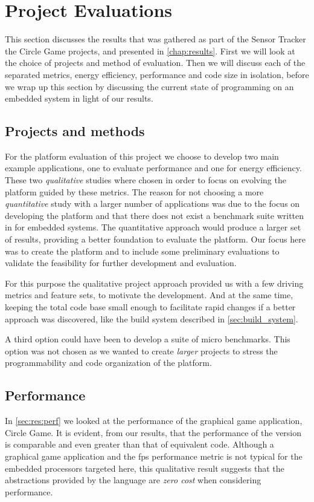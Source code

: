 
\section{Project Evaluations}
\label{sec:disc:project_evaluations}

This section discusses the results that was gathered as part of the Sensor Tracker the Circle Game projects, and presented in \autoref{chap:results}.
First we will look at the choice of projects and method of evaluation.
Then we will discuss each of the separated metrics, energy efficiency, performance and code size in isolation, before we wrap up this section by discussing the current state of {\rust} programming on an embedded system in light of our results.

\subsection{Projects and methods}

For the platform evaluation of this project we choose to develop two main example applications, one to evaluate performance and one for energy efficiency.
These two \emph{qualitative} studies where chosen in order to focus on evolving the platform guided by these metrics.
The reason for not choosing a more \emph{quantitative} study with a larger number of applications was due to the focus on developing the platform and that there does not exist a benchmark suite written in {\rust} for embedded systems.
The quantitative approach would produce a larger set of results, providing a better foundation to evaluate the platform.
Our focus here was to create the platform and to include some preliminary evaluations to validate the feasibility for further development and evaluation.

For this purpose the qualitative project approach provided us with a few driving metrics and feature sets, to motivate the development.
And at the same time, keeping the total code base small enough to facilitate rapid changes if a better approach was discovered, like the build system described in \autoref{sec:build_system}.

A third option could have been to develop a suite of micro benchmarks.
This option was not chosen as we wanted to create \emph{larger} projects to stress the programmability and code organization of the platform.

\subsection{Performance}
In \autoref{sec:res:perf} we looked at the performance of the graphical game application, Circle Game.
It is evident, from our results, that the performance of the {\rust} version is comparable and even greater than that of equivalent {\C} code.
Although a graphical game application and the \gls{fps} performance metric is not typical for the embedded processors targeted here, this qualitative result suggests that the abstractions provided by the {\rust} language are \emph{zero cost} when considering performance.

